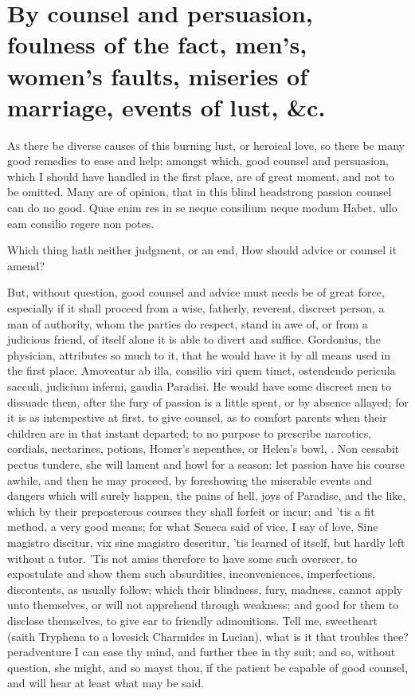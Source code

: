 {%
\section[Counsel and persuasion]{By counsel and persuasion, foulness of the fact, men's, women's faults, miseries of marriage, events of lust, \&c.}

\lettrine{A}{s} there be diverse causes of this burning lust, or heroical love, so
there be many good remedies to ease and help; amongst which, good
counsel and persuasion, which I should have handled in the first place,
are of great moment, and not to be omitted. Many are of opinion, that
in this blind headstrong passion counsel can do no good.
Quae enim res in se neque consilium neque modum
Habet, ullo eam consilio regere non potes.

Which thing hath neither judgment, or an end,
How should advice or counsel it amend?

 But, without question, good counsel
and advice must needs be of great force, especially if it shall proceed
from a wise, fatherly, reverent, discreet person, a man of authority,
whom the parties do respect, stand in awe of, or from a judicious
friend, of itself alone it is able to divert and suffice. Gordonius,
the physician, attributes so much to it, that he would have it by all
means used in the first place. Amoveatur ab illa, consilio viri quem
timet, ostendendo pericula saeculi, judicium inferni, gaudia Paradisi.
He would have some discreet men to dissuade them, after the fury of
passion is a little spent, or by absence allayed; for it is as
intempestive at first, to give counsel, as to comfort parents when
their children are in that instant departed; to no purpose to prescribe
narcotics, cordials, nectarines, potions, Homer's nepenthes, or Helen's
bowl, \etc{}. Non cessabit pectus tundere, she will lament and howl for a
season: let passion have his course awhile, and then he may proceed, by
foreshowing the miserable events and dangers which will surely happen,
the pains of hell, joys of Paradise, and the like, which by their
preposterous courses they shall forfeit or incur; and 'tis a fit
method, a very good means; for what Seneca said of vice, I say of
love, Sine magistro discitur, vix sine magistro deseritur, 'tis learned
of itself, but hardly left without a tutor. 'Tis not amiss
therefore to have some such overseer, to expostulate and show them such
absurdities, inconveniences, imperfections, discontents, as usually
follow; which their blindness, fury, madness, cannot apply unto
themselves, or will not apprehend through weakness; and good for them
to disclose themselves, to give ear to friendly admonitions. Tell me,
sweetheart (saith Tryphena to a lovesick Charmides in Lucian),
what is it that troubles thee? peradventure I can ease thy mind, and
further thee in thy suit; and so, without question, she might, and so
mayst thou, if the patient be capable of good counsel, and will hear at
least what may be said.

}
